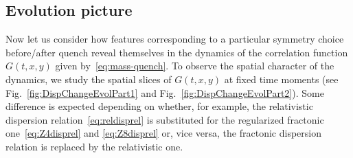 \documentclass[a4paper,12pt]{article}
\newcommand{\figref}[1]{Fig.~\ref{#1}}
\begin{document}
\subsection*{Evolution picture}

Now let us consider how features corresponding to a particular symmetry choice before/after quench reveal themselves in the dynamics of the correlation function $G(t, x, y)$ given by~\eqref{eq:mass-quench}. To observe the spatial character of the dynamics, we study the spatial slices of $G(t, x, y)$ at fixed time moments (see \figref{fig:DispChangeEvolPart1} and \figref{fig:DispChangeEvolPart2}). Some difference is expected depending on whether, for example, the relativistic dispersion relation~\eqref{eq:reldisprel} is substituted for the regularized fractonic one~\eqref{eq:Z4disprel} and \eqref{eq:Z8disprel} or, vice versa, the fractonic dispersion relation is replaced by the relativistic one.
\end{document}
